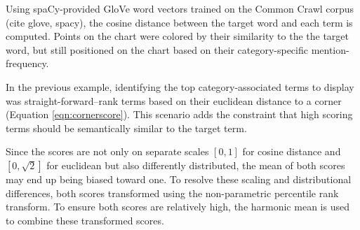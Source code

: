 \documentclass[11pt]{article}
\begin{document}
Using spaCy-provided GloVe \cite{glove} word vectors trained on the Common Crawl corpus (cite glove, spacy), the cosine distance between the target word and each term is computed.  Points on the chart were colored by their similarity to the the target word, but still positioned on the chart based on their category-specific mention-frequency.

In the previous example, identifying the top category-associated terms to display was straight-forward--rank terms based on their euclidean distance to a corner (Equation \ref{eqn:cornerscore}).  This scenario adds the constraint that high scoring terms should be semantically similar to the target term. 

Since the scores are not only on separate scales $[0,1]$ for cosine distance and $[0, \sqrt{2}]$ for euclidean but also differently distributed, the mean of both scores may end up being biased toward one.  To resolve these scaling and distributional differences, both scores transformed using the non-parametric percentile rank transform.  To ensure both scores are relatively high, the harmonic mean is used to combine these transformed scores.

\nocite{ggplot2}
\nocite{Rudder2014}
\nocite{tidytext}


\end{document}
